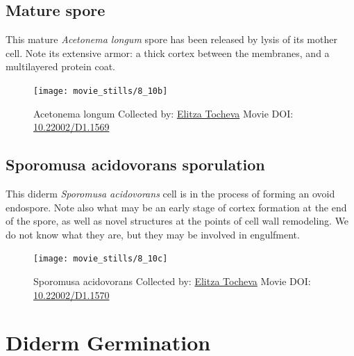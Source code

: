 \documentclass[]{tufte-book}
\begin{document}
\hypertarget{Mature_spore}{\subsection{Mature
spore}\label{Mature_spore}}

This mature \emph{Acetonema longum} spore has been released by lysis of
its mother cell. Note its extensive armor: a thick cortex between the
membranes, and a multilayered protein coat.





\begin{figure}
\texttt{[image: movie\_stills/8\_10b]} \caption[Acetonema longum Collected by:
\protect\hyperlink{elitza_tocheva}{Elitza Tocheva} Movie DOI:
\href{https://doi.org/10.22002/D1.1569}{10.22002/D1.1569}]{Acetonema longum Collected by:
\protect\hyperlink{elitza_tocheva}{Elitza Tocheva} Movie DOI:
\href{https://doi.org/10.22002/D1.1569}{10.22002/D1.1569}}\label{fig:8-10b}
\end{figure}

\hypertarget{Sporomusa_acidovorans_sporulation}{\subsection{Sporomusa
acidovorans sporulation}\label{Sporomusa_acidovorans_sporulation}}

This diderm \emph{Sporomusa acidovorans} cell is in the process of
forming an ovoid endospore. Note also what may be an early stage of
cortex formation at the end of the spore, as well as novel structures at
the points of cell wall remodeling. We do not know what they are, but
they may be involved in engulfment.





\begin{figure}
\texttt{[image: movie\_stills/8\_10c]} \caption[Sporomusa acidovorans Collected by:
\protect\hyperlink{elitza_tocheva}{Elitza Tocheva} Movie DOI:
\href{https://doi.org/10.22002/D1.1570}{10.22002/D1.1570}]{Sporomusa acidovorans Collected by:
\protect\hyperlink{elitza_tocheva}{Elitza Tocheva} Movie DOI:
\href{https://doi.org/10.22002/D1.1570}{10.22002/D1.1570}}\label{fig:8-10c}
\end{figure}

\section{Diderm Germination}\label{diderm-germination}
\end{document}
